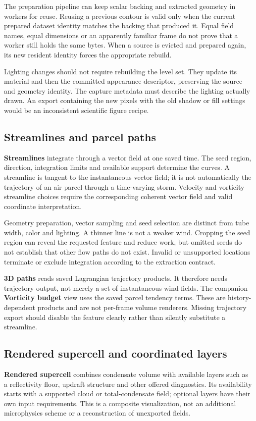 The preparation pipeline can keep scalar backing and extracted geometry in
workers for reuse. Reusing a previous contour is valid only when the current
prepared dataset identity matches the backing that produced it. Equal field
names, equal dimensions or an apparently familiar frame do not prove that a
worker still holds the same bytes. When a source is evicted and prepared again,
its new resident identity forces the appropriate rebuild.

Lighting changes should not require rebuilding the level set. They update its
material and then the committed appearance descriptor, preserving the source
and geometry identity. The capture metadata must describe the lighting actually
drawn. An export containing the new pixels with the old shadow or fill settings
would be an inconsistent scientific figure recipe.

\subsection{Streamlines and parcel paths}
\textbf{Streamlines} integrate through a vector field at one saved time. The
seed region, direction, integration limits and available support determine the
curves. A streamline is tangent to the instantaneous vector field; it is not
automatically the trajectory of an air parcel through a time-varying storm.
Velocity and vorticity streamline choices require the corresponding coherent
vector field and valid coordinate interpretation.

Geometry preparation, vector sampling and seed selection are distinct from
tube width, color and lighting. A thinner line is not a weaker wind. Cropping
the seed region can reveal the requested feature and reduce work, but omitted
seeds do not establish that other flow paths do not exist. Invalid or unsupported
locations terminate or exclude integration according to the extraction contract.

\textbf{3D paths} reads saved Lagrangian trajectory products. It therefore needs
trajectory output, not merely a set of instantaneous wind fields. The companion
\textbf{Vorticity budget} view uses the saved parcel tendency terms. These are
history-dependent products and are not per-frame volume renderers. Missing
trajectory export should disable the feature clearly rather than silently
substitute a streamline.

\subsection{Rendered supercell and coordinated layers}
\textbf{Rendered supercell} combines condensate volume with available layers
such as a reflectivity floor, updraft structure and other offered diagnostics.
Its availability starts with a supported cloud or total-condensate field;
optional layers have their own input requirements. This is a composite
visualization, not an additional microphysics scheme or a reconstruction of
unexported fields.

